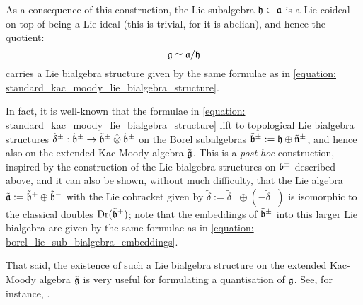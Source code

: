 As a consequence of this construction, the Lie subalgebra $\mathfrak{h} \subset \mathfrak{a}$ is a Lie coideal on top of being a Lie ideal (this is trivial, for it is abelian), and hence the quotient:
    $$\mathfrak{g} \simeq \mathfrak{a}/\mathfrak{h}$$
carries a Lie bialgebra structure given by the same formulae as in \eqref{equation: standard_kac_moody_lie_bialgebra_structure}.
\begin{remark}
    In fact, it is well-known that the formulae in \eqref{equation: standard_kac_moody_lie_bialgebra_structure} lift to topological Lie bialgebra structures $\tilde{\delta}^{\pm}: \tilde{\b}^{\pm} \to \tilde{\b}^{\pm} \hattensor \tilde{\b}^{\pm}$ on the Borel subalgebras $\tilde{\mathfrak{b}}^{\pm} := \mathfrak{h} \oplus \tilde{\mathfrak{n}}^{\pm}$, and hence also on the extended Kac-Moody algebra $\tilde{\mathfrak{g}}$. This is a \textit{post hoc} construction, inspired by the construction of the Lie bialgebra structures on $\mathfrak{b}^{\pm}$ described above, and it can also be shown, without much difficulty, that the Lie algebra $\tilde{\mathfrak{a}} := \tilde{\mathfrak{b}}^+ \oplus \tilde{\mathfrak{b}}^-$ with the Lie cobracket given by $\tilde{\delta} := \tilde{\delta}^+ \oplus (-\tilde{\delta}^-)$ is isomorphic to the classical doubles $\operatorname{Dr}(\tilde{\mathfrak{b}}^{\pm})$; note that the embeddings of $\tilde{\mathfrak{b}}^{\pm}$ into this larger Lie bialgebra are given by the same formulae as in \eqref{equation: borel_lie_sub_bialgebra_embeddings}. 

    That said, the existence of such a Lie bialgebra structure on the extended Kac-Moody algebra $\tilde{\mathfrak{g}}$ is very useful for formulating a quantisation of $\mathfrak{g}$. See, for instance, \cite{etingof_kazhdan_quantisation_6}. 
\end{remark}